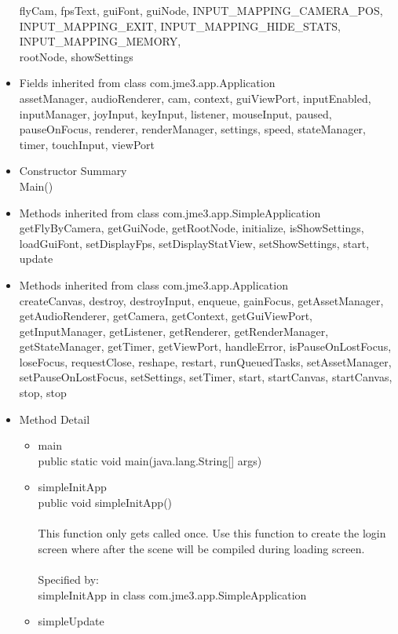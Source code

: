 \documentclass[letterpaper]{article}
\begin{document}
\begin{itemize}
									flyCam, fpsText, guiFont, guiNode, INPUT\_MAPPING\_CAMERA\_POS, \\ INPUT\_MAPPING\_EXIT, INPUT\_MAPPING\_HIDE\_STATS, INPUT\_MAPPING\_MEMORY, \\ rootNode, showSettings
							\item	Fields inherited from class com.jme3.app.Application \\
									assetManager, audioRenderer, cam, context, guiViewPort, inputEnabled, inputManager, joyInput, keyInput, listener, mouseInput, paused, pauseOnFocus, renderer, renderManager, settings, speed, stateManager, timer, touchInput, viewPort
							\item	Constructor Summary \\
									Main()
							\item	Methods inherited from class com.jme3.app.SimpleApplication \\
									getFlyByCamera, getGuiNode, getRootNode, initialize, isShowSettings, loadGuiFont, setDisplayFps, setDisplayStatView, setShowSettings, start, update
							\item	Methods inherited from class com.jme3.app.Application \\
									createCanvas, destroy, destroyInput, enqueue, gainFocus, getAssetManager, getAudioRenderer, getCamera, getContext, getGuiViewPort, getInputManager, getListener, getRenderer, getRenderManager, getStateManager, getTimer, getViewPort, handleError, isPauseOnLostFocus, loseFocus, requestClose, reshape, restart, runQueuedTasks, setAssetManager, setPauseOnLostFocus, setSettings, setTimer, start, startCanvas, startCanvas, stop, stop
							\item	Method Detail
									\begin{itemize}
										\item	main \\
												public static void main(java.lang.String[] args)
										\item	simpleInitApp \\
												public void simpleInitApp() \\ \\
												This function only gets called once. Use this function to create the login screen where after the scene will be compiled during loading screen. \\ \\
												Specified by: \\
												simpleInitApp in class com.jme3.app.SimpleApplication
										\item	simpleUpdate \\

\end{itemize}
\end{itemize}
\end{document}
